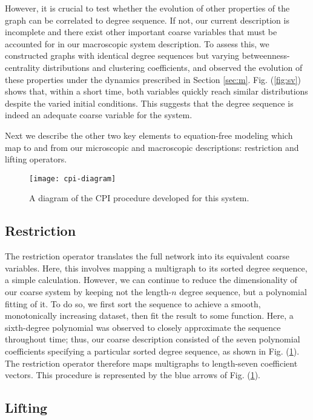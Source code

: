 \documentclass[12pt]{article}
\begin{document}
\begin{onehalfspace}
However, it is crucial to test whether the evolution of other properties of the graph can be correlated to degree sequence. If not, our current description is incomplete and there exist other  important coarse variables that must be accounted for in our macroscopic system description. To assess this, we constructed graphs with identical degree sequences but varying betweenness-centrality distributions and clustering coefficients, and observed the evolution of these properties under the dynamics prescribed in Section \ref{sec:m}. Fig. (\ref{fig:sv}) shows that, within a short time, both variables quickly reach similar distributions despite the varied initial conditions. This suggests that the degree sequence is indeed an adequate coarse variable for the system. \par

Next we describe the other two key elements to equation-free modeling which map to and from our microscopic and macroscopic descriptions: restriction and lifting operators.

\begin{figure}[ht!]
  \centering
  \texttt{[image: cpi-diagram]}
  \caption{A diagram of the CPI procedure developed for this system. \label{fig:cpi-diagram}}
\end{figure}


\subsection{Restriction}

The restriction operator translates the full network into its equivalent coarse variables. Here, this involves mapping a multigraph to its sorted degree sequence, a simple calculation. However, we can continue to reduce the dimensionality of our coarse system by keeping not the length-$n$ degree sequence, but a polynomial fitting of it. To do so, we first sort the sequence to achieve a smooth, monotonically increasing dataset, then fit the result to some function. Here, a sixth-degree polynomial was observed to closely approximate the sequence throughout time; thus, our coarse description consisted of the seven polynomial coefficients specifying a particular sorted degree sequence, as shown in Fig. (\ref{fig:cpi-diagram}). The restriction operator therefore maps multigraphs to length-seven coefficient vectors. This procedure is represented by the blue arrows of Fig. (\ref{fig:cpi-diagram}).

\subsection{Lifting}


\end{onehalfspace}
\end{document}
